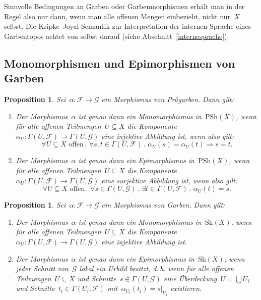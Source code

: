 \documentclass[a4paper,ngerman,12pt]{scrartcl}
\theoremstyle{definition}
\theoremstyle{plain}
\newtheorem{prop}[defn]{Proposition}
\theoremstyle{remark}
\newcommand{\F}{\mathcal{F}}
\newcommand{\G}{\mathcal{G}}
\newcommand{\Sh}{\mathrm{Sh}}
\newcommand{\PSh}{\mathrm{PSh}}
\renewcommand{\_}{\mathpunct{.}\,}
\newcommand{\?}{\,{:}\,}
\begin{document}
Sinnvolle Bedingungen an Garben oder Garbenmorphismen erhält man in der Regel
also nur dann, wenn man alle offenen Mengen einbezieht, nicht nur~$X$ selbst.
Die Kripke--Joyal-Semantik zur Interpretation der internen Sprache eines
Garbentopos achtet von selbst darauf (siehe Abschnitt~\ref{internesprache}).


\subsection{Monomorphismen und Epimorphismen von Garben}

\begin{prop}Sei~$\alpha : \F \to \G$ ein Morphismus von Prägarben. Dann gilt:
\begin{enumerate}
\item Der Morphismus~$\alpha$ ist genau dann ein Monomorphismus in~$\PSh(X)$,
wenn für alle offenen Teilmengen~$U \subseteq X$ die Komponente~$\alpha_U :
\Gamma(U,\F) \to \Gamma(U,\G)$ eine injektive Abbildung ist, wenn also gilt:
\[ \forall \text{$U \subseteq X$ offen}\_
  \forall s,t \in \Gamma(U,\F)\_
  \alpha_U(s) = \alpha_U(t) \Rightarrow s = t. \]
\item Der Morphismus~$\alpha$ ist genau dann ein Epimorphismus in~$\PSh(X)$,
wenn für alle offenen Teilmengen~$U \subseteq X$ die Komponente~$\alpha_U :
\Gamma(U,\F) \to \Gamma(U,\G)$ eine surjektive Abbildung ist, wenn also gilt:
\[ \forall \text{$U \subseteq X$ offen}\_
  \forall s \in \Gamma(U,\G)\_
  \exists t \in \Gamma(U,\F)\_
  \alpha_U(t) = s. \]
\end{enumerate}
\end{prop}

\begin{prop}Sei~$\alpha : \F \to \G$ ein Morphismus von Garben. Dann gilt:
\begin{enumerate}
\item Der Morphismus~$\alpha$ ist genau dann ein Monomorphismus in~$\Sh(X)$,
wenn für alle offenen Teilmengen~$U \subseteq X$ die Komponente~$\alpha_U :
\Gamma(U,\F) \to \Gamma(U,\G)$ eine injektive Abbildung ist.
\item Der Morphismus~$\alpha$ ist genau dann ein Epimorphismus in~$\Sh(X)$,
wenn jeder Schnitt von~$\G$ \emph{lokal} ein Urbild besitzt, d.\,h. wenn für
alle offenen Teilmengen~$U \subseteq X$ und Schnitte~$s \in \Gamma(U,\G)$ eine
Überdeckung~$U = \bigcup U_i$ und Schnitte~$t_i \in \Gamma(U_i,\F)$
mit~$\alpha_{U_i}(t_i) = s|_{U_i}$ existieren.
\end{enumerate}
\end{prop}
\end{document}
